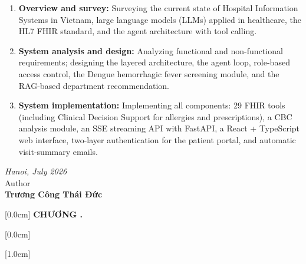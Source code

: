 \documentclass[a4paper,13pt,3p,oneside]{report}
\theoremstyle{definition}
\theoremstyle{remark}
\theoremstyle{definition}
\begin{document}
\begin{enumerate}
\item \textbf{Overview and survey:} Surveying the current state of Hospital Information Systems in Vietnam, large language models (LLMs) applied in healthcare, the HL7 FHIR standard, and the agent architecture with tool calling.

\item \textbf{System analysis and design:} Analyzing functional and non-functional requirements; designing the layered architecture, the agent loop, role-based access control, the Dengue hemorrhagic fever screening module, and the RAG-based department recommendation.

\item \textbf{System implementation:} Implementing all components: 29 FHIR tools (including Clinical Decision Support for allergies and prescriptions), a CBC analysis module, an SSE streaming API with FastAPI, a React + TypeScript web interface, two-layer authentication for the patient portal, and automatic visit-summary emails.
\end{enumerate}

\hspace{0.5\textwidth}
\begin{minipage}{0.5\textwidth}
	\noindent\begin{center}
		\vspace{1cm}
		\textit{Hanoi, July 2026} \\
		Author\\ \vspace{2cm}
		\textbf{Trương Công Thái Đức}
	\end{center}
\end{minipage}

\newpage
{}
\renewcommand*\contentsname{MỤC LỤC}
    [0.0cm]
    {\bfseries\vspace{0.3cm}}
    {{\bfseries{\scshape} CHƯƠNG \thecontentslabel.\ }}
    {}
    {\contentspage}

    [0.0cm]
    {\vspace{0.3cm}}
    {\thecontentslabel \ }
    {}
    {\contentspage}

    [1.0cm]
    {\vspace{0.3cm}}
    {\thecontentslabel \ }
    {}
    {\contentspage}
\end{document}
